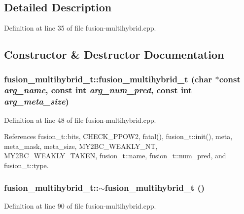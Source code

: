 \subsection{Detailed Description}


Definition at line 35 of file fusion-multihybrid.cpp.

\subsection{Constructor \& Destructor Documentation}
\subsubsection[{fusion\_\-multihybrid\_\-t}]{\setlength{\rightskip}{0pt plus 5cm}fusion\_\-multihybrid\_\-t::fusion\_\-multihybrid\_\-t (char $\ast$const  {\em arg\_\-name}, \/  const int {\em arg\_\-num\_\-pred}, \/  const int {\em arg\_\-meta\_\-size})\hspace{0.3cm}{\tt  [inline]}}\label{classfusion__multihybrid__t_ee0f68e6dda5d2af198902b89d55fae5}




Definition at line 48 of file fusion-multihybrid.cpp.

References fusion\_\-t::bits, CHECK\_\-PPOW2, fatal(), fusion\_\-t::init(), meta, meta\_\-mask, meta\_\-size, MY2BC\_\-WEAKLY\_\-NT, MY2BC\_\-WEAKLY\_\-TAKEN, fusion\_\-t::name, fusion\_\-t::num\_\-pred, and fusion\_\-t::type.
\subsubsection[{$\sim$fusion\_\-multihybrid\_\-t}]{\setlength{\rightskip}{0pt plus 5cm}fusion\_\-multihybrid\_\-t::$\sim$fusion\_\-multihybrid\_\-t ()\hspace{0.3cm}{\tt  [inline]}}\label{classfusion__multihybrid__t_8023c1977f0b91bade0b280668d3aa14}




Definition at line 90 of file fusion-multihybrid.cpp.

